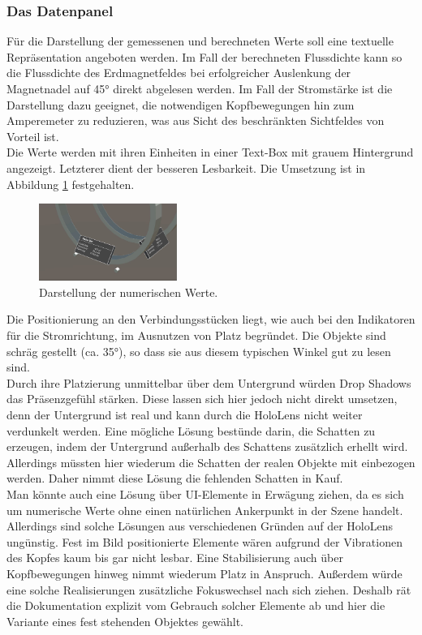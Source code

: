 \subsubsection{Das Datenpanel}
\label{sec-4-2-5}
Für die Darstellung der gemessenen und berechneten Werte soll eine textuelle Repräsentation angeboten werden. Im Fall der berechneten Flussdichte kann so die Flussdichte des Erdmagnetfeldes bei erfolgreicher Auslenkung der Magnetnadel auf 45° direkt abgelesen werden. Im Fall der Stromstärke ist die Darstellung dazu geeignet, die notwendigen Kopfbewegungen hin zum Amperemeter zu reduzieren, was aus Sicht des beschränkten Sichtfeldes von Vorteil ist.\\
\noindent\hspace*{5mm}
Die Werte werden mit ihren Einheiten in einer Text-Box mit grauem Hintergrund angezeigt. Letzterer dient der besseren Lesbarkeit. Die Umsetzung ist in Abbildung \ref{img:status} festgehalten.

\begin{figure}
	\centering
	\includegraphics[width=0.4\textwidth]{images/unity/status.jpg}
	\caption{Darstellung der numerischen Werte.}
	\label{img:status}
\end{figure}

Die Positionierung an den Verbindungsstücken liegt, wie auch bei den Indikatoren für die Stromrichtung, im Ausnutzen von Platz begründet. Die Objekte sind schräg gestellt (ca. 35°), so dass sie aus diesem typischen Winkel gut zu lesen sind.\\

Durch ihre Platzierung unmittelbar über dem Untergrund würden Drop Shadows das Präsenzgefühl stärken. Diese lassen sich hier jedoch nicht direkt umsetzen, denn der Untergrund ist real und kann durch die HoloLens nicht weiter verdunkelt werden. Eine mögliche Lösung bestünde darin, die Schatten zu erzeugen, indem der Untergrund außerhalb des Schattens zusätzlich erhellt wird. Allerdings müssten hier wiederum die Schatten der realen Objekte mit einbezogen werden. Daher nimmt diese Lösung die fehlenden Schatten in Kauf.\\

Man könnte auch eine Lösung über UI-Elemente in Erwägung ziehen, da es sich um numerische Werte ohne einen natürlichen Ankerpunkt in der Szene handelt. Allerdings sind solche Lösungen aus verschiedenen Gründen auf der HoloLens ungünstig. Fest im Bild positionierte Elemente wären aufgrund der Vibrationen des Kopfes kaum bis gar nicht lesbar. Eine Stabilisierung auch über Kopfbewegungen hinweg nimmt wiederum Platz in Anspruch. Außerdem würde eine solche Realisierungen zusätzliche Fokuswechsel nach sich ziehen. Deshalb rät die Dokumentation explizit vom Gebrauch solcher Elemente ab und hier die Variante eines fest stehenden Objektes gewählt.\\

